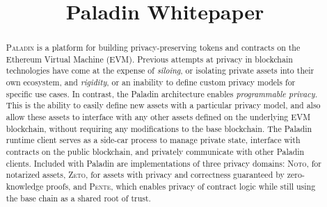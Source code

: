 \documentclass[conference,compsoc,onecolumn]{IEEEtran}
\date{}
\author{}
\begin{document}
\title{Paladin Whitepaper}

\maketitle


\begin{abstract}

\textsc{Paladin} is a platform for building privacy-preserving tokens and contracts on the Ethereum Virtual Machine (EVM). Previous attempts at privacy in blockchain technologies have come at the expense of \textit{siloing}, or isolating private assets into their own ecosystem, and \textit{rigidity}, or an inability to define custom privacy models for specific use cases. In contrast, the Paladin architecture enables \textit{programmable privacy}. This is the ability to easily define new assets with a particular privacy model, and also allow these assets to interface with any other assets defined on the underlying EVM blockchain, without requiring any modifications to the base blockchain. The Paladin runtime client serves as a side-car process to manage private state, interface with contracts on the public blockchain, and privately communicate with other Paladin clients. Included with Paladin are implementations of three privacy domains: \textsc{Noto}, for notarized assets, \textsc{Zeto}, for assets with privacy and correctness guaranteed by zero-knowledge proofs, and \textsc{Pente}, which enables privacy of contract logic while still using the base chain as a shared root of trust.

\end{abstract}














\appendices
% 
\end{document}
